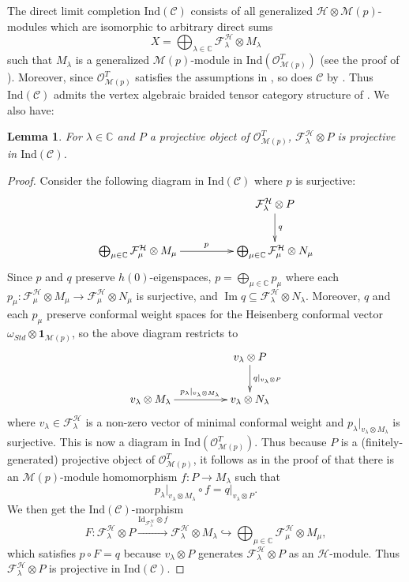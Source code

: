 \documentclass[11pt, reqno]{amsart}
\newtheorem{lem}[thm]{Lemma}
\theoremstyle{definition}\newtheorem{defi}[thm]{Definition}
\theoremstyle{definition}\newtheorem{rem}[thm]{Remark}
\theoremstyle{definition}\newtheorem{exam}[thm]{Example}
\theoremstyle{definition}\newtheorem{assum}[thm]{Assumption}
\newcommand{\cH}{\mathcal{H}}
\newcommand{\cM}{\mathcal{M}}
\newcommand{\cF}{\mathcal{F}}
\newcommand{\cO}{\mathcal{O}}
\newcommand{\cC}{\mathcal{C}}
\newcommand{\CC}{\mathbb{C}}
\newcommand{\Id}{\mathrm{Id}}
\newcommand{\vac}{\mathbf{1}}
\newcommand{\ind}{\mathrm{Ind}}
\DeclareMathOperator{\im}{Im}
\begin{document}
The direct limit completion $\ind(\mathcal{C})$ consists of all generalized $\cH \otimes \cM(p)$-modules which are isomorphic to arbitrary direct sums
\begin{equation*}
 X=\bigoplus_{\lambda\in\CC} \cF_\lambda^\cH\otimes M_\lambda
\end{equation*}
such that $M_\lambda$ is a generalized $\cM(p)$-module in $\ind(\cO_{\cM(p)}^T)$ (see the proof of \cite[Proposition 3.6]{McR-cosets}). Moreover, since $\cO_{\cM(p)}^T$ satisfies the assumptions in \cite[Theorem 1.1]{CMY-completions}, so does $\cC$ by \cite[Proposition 3.6]{McR-cosets}. Thus $\ind(\cC)$ admits the vertex algebraic braided tensor category structure of \cite{HLZ8}. We also have:
\begin{lem}
For $\lambda\in\CC$ and $P$ a projective object of $\cO_{\cM(p)}^T$, $\cF^\cH_\lambda\otimes P$ is projective in $\ind(\cC)$.
\end{lem}
\begin{proof}
Consider the following diagram in $\ind(\cC)$ where $p$ is surjective:
\begin{equation*}
\xymatrixcolsep{4pc}
\xymatrix{
& \cF^\cH_\lambda\otimes P \ar[d]^{q} \\
\bigoplus_{\mu\in\CC} \cF^\cH_\mu\otimes M_\mu \ar[r]^{p} & \bigoplus_{\mu\in\CC} \cF^\cH_\mu\otimes N_\mu \\
}
\end{equation*}
Since $p$ and $q$ preserve $h(0)$-eigenspaces, $p=\bigoplus_{\mu\in\CC} p_\mu$ where each $p_\mu: \cF^\cH_\mu\otimes M_\mu\rightarrow \cF^\cH_\mu\otimes N_\mu$ is surjective, and $\im q\subseteq\cF^\cH_\lambda\otimes N_\lambda$. Moreover, $q$ and each $p_\mu$ preserve conformal weight spaces for the Heisenberg conformal vector $\omega_{Std}\otimes\vac_{\cM(p)}$, so the above diagram restricts to
\begin{equation*}
\xymatrixcolsep{4pc}
\xymatrix{
&v_\lambda\otimes P \ar[d]^{q\vert_{v_\lambda\otimes P}}\\
v_\lambda\otimes M_\lambda \ar[r]^{p_\lambda\vert_{v_\lambda\otimes M_\lambda}} & v_\lambda\otimes N_\lambda\\
}
\end{equation*}
where $v_\lambda\in\cF_\lambda^\cH$ is a non-zero vector of minimal conformal weight and $p_\lambda\vert_{v_\lambda\otimes M_\lambda}$ is surjective. This is now a diagram in $\ind(\cO_{\cM(p)}^T)$. Thus because $P$ is a (finitely-generated) projective object of $\cO_{\cM(p)}^T$, it follows as in the proof of \cite[Lemma 5.0.3]{CMY3} that there is an $\cM(p)$-module homomorphism $f: P\rightarrow M_\lambda$ such that 
\[
p_\lambda\vert_{v_\lambda\otimes M_\lambda}\circ f= q\vert_{v_\lambda\otimes P}.
\]
We then get the $\ind(\cC)$-morphism 
\begin{equation*}
F: \cF^\cH_\lambda\otimes P \xrightarrow{\Id_{\cF^\cH_\lambda}\otimes f} \cF^\cH_\lambda\otimes M_\lambda\hookrightarrow\bigoplus_{\mu\in\CC} \cF^\cH_\mu\otimes M_\mu,
\end{equation*}
which satisfies $p\circ F=q$ because $v_\lambda\otimes P$ generates $\cF^\cH_\lambda\otimes P$ as an $\cH$-module. Thus $\cF^\cH_\lambda\otimes P$ is projective in $\ind(\cC)$.
\end{proof}
\end{document}
